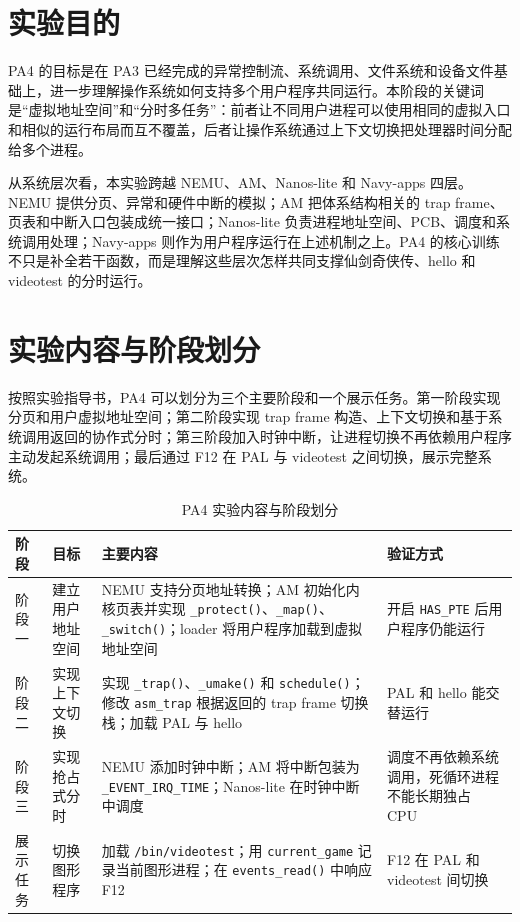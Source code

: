 \section{实验目的}

PA4 的目标是在 PA3 已经完成的异常控制流、系统调用、文件系统和设备文件基础上，进一步理解操作系统如何支持多个用户程序共同运行。本阶段的关键词是“虚拟地址空间”和“分时多任务”：前者让不同用户进程可以使用相同的虚拟入口和相似的运行布局而互不覆盖，后者让操作系统通过上下文切换把处理器时间分配给多个进程。

从系统层次看，本实验跨越 NEMU、AM、Nanos-lite 和 Navy-apps 四层。NEMU 提供分页、异常和硬件中断的模拟；AM 把体系结构相关的 trap frame、页表和中断入口包装成统一接口；Nanos-lite 负责进程地址空间、PCB、调度和系统调用处理；Navy-apps 则作为用户程序运行在上述机制之上。PA4 的核心训练不只是补全若干函数，而是理解这些层次怎样共同支撑仙剑奇侠传、hello 和 videotest 的分时运行。

\section{实验内容与阶段划分}

按照实验指导书，PA4 可以划分为三个主要阶段和一个展示任务。第一阶段实现分页和用户虚拟地址空间；第二阶段实现 trap frame 构造、上下文切换和基于系统调用返回的协作式分时；第三阶段加入时钟中断，让进程切换不再依赖用户程序主动发起系统调用；最后通过 F12 在 PAL 与 videotest 之间切换，展示完整系统。

\begin{table}[H]
\centering
\caption{PA4 实验内容与阶段划分}
\label{tab:pa4-stage-plan}
\small
\begin{tabularx}{\textwidth}{p{} p{} X p{}}
\toprule
阶段 & 目标 & 主要内容 & 验证方式 \\
\midrule
阶段一 & 建立用户地址空间 & NEMU 支持分页地址转换；AM 初始化内核页表并实现 \texttt{\_protect()}、\texttt{\_map()}、\texttt{\_switch()}；loader 将用户程序加载到虚拟地址空间 & 开启 \texttt{HAS\_PTE} 后用户程序仍能运行 \\
\midrule
阶段二 & 实现上下文切换 & 实现 \texttt{\_trap()}、\texttt{\_umake()} 和 \texttt{schedule()}；修改 \texttt{asm\_trap} 根据返回的 trap frame 切换栈；加载 PAL 与 hello & PAL 和 hello 能交替运行 \\
\midrule
阶段三 & 实现抢占式分时 & NEMU 添加时钟中断；AM 将中断包装为 \texttt{\_EVENT\_IRQ\_TIME}；Nanos-lite 在时钟中断中调度 & 调度不再依赖系统调用，死循环进程不能长期独占 CPU \\
\midrule
展示任务 & 切换图形程序 & 加载 \texttt{/bin/videotest}；用 \texttt{current\_game} 记录当前图形进程；在 \texttt{events\_read()} 中响应 F12 & F12 在 PAL 和 videotest 间切换 \\
\bottomrule
\end{tabularx}
\end{table}

